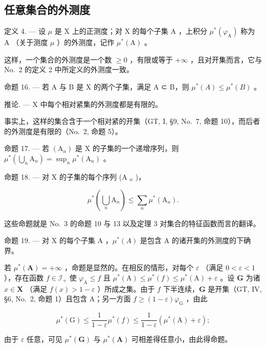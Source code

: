 \subsection{任意集合的外测度}

定义 4. --- 设 \(\mu\) 是 X 上的正测度；对 X 的每个子集 A ，上积分 \(\mu^{*}(\varphi_{\mathrm{A}})\) 称为 A （关于测度 \(\mu\) ）的外测度，记作 \(\mu^{*}(\mathrm{A})\) 。

这样，一个集合的外测度是一个数 \(\geqslant0\) ，有限或等于 \(+\infty\) ，且对开集而言，它与 No.~2 的定义 2 中所定义的外测度一致。

命题 16. --- 若 A 与 B 是 X 的两个子集，满足 A ⊂ B，则 \(\mu^{*}(A) \leqslant \mu^{*}(B)\) 。

推论. --- X 中每个相对紧集的外测度都是有限的。

事实上，这样的集合含于一个相对紧的开集（GT, I, §9, No.~7, 命题 10），而后者的外测度是有限的（No.~2, 命题 5）。

命题 17. --- 若 \((\mathrm{A}_{n})\) 是 X 的子集的一个递增序列，则 \(\mu^{*}(\bigcup_{n}\mathrm{A}_{n})=\sup_{n}\mu^{*}(\mathrm{A}_{n})\) 。

命题 18. --- 对 X 的子集的每个序列 (A \(_{n}\) )，

\[
\mu^ {*} \left(\bigcup_ {n} \mathrm{A} _ {n}\right) \leqslant \sum_ {n} \mu^ {*} (\mathrm{A} _ {n}).
\]

这些命题就是 No.~3 的命题 10 与 13 以及定理 3 对集合的特征函数而言的翻译。

命题 19. --- 对 X 的每个子集 A ，\(\mu^{*}(A)\) 是包含 A 的诸开集的外测度的下确界。

若 \(\mu^{*}(\mathbf{A}) = +\infty\) ，命题是显然的。在相反的情形，对每个 \(\varepsilon\) （满足 \(0 < \varepsilon < 1\) ），存在函数 \(f \in \mathcal{I}_{+}\) 使 \(\varphi_{\mathrm{A}} \leqslant f\) 且 \(\mu^{*}(\mathrm{A}) \leqslant \mu^{*}(f) \leqslant \mu^{*}(\mathrm{A}) + \varepsilon\) 。设 \(\mathbf{G}\) 为诸 \(x \in \mathbf{X}\) （满足 \(f(x) > 1 - \varepsilon\) ）所成之集。由于 \(f\) 下半连续，\(\mathbf{G}\) 是开集（GT, IV, §6, No.~2, 命题 1）且包含 A；另一方面 \(f \geqslant (1 - \varepsilon)\varphi_{\mathrm{G}}\) ，由此

\[
\mu^ {*} (\mathrm{G}) \leqslant \frac {1}{1 - \varepsilon} \mu^ {*} (f) \leqslant \frac {1}{1 - \varepsilon} \left(\mu^ {*} (\mathrm{A}) + \varepsilon\right);
\]

由于 \(\varepsilon\) 任意，可见 \(\mu^{*}(\mathbf{G})\) 与 \(\mu^{*}(\mathbf{A})\) 可相差得任意小，由此得命题。

